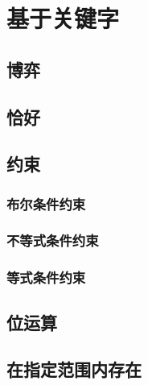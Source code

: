 \section{基于关键字}
\subsection{博弈}
\subsection{恰好}
\subsection{约束}
\subsubsection{布尔条件约束}
\subsubsection{不等式条件约束}
\subsubsection{等式条件约束}
\subsection{位运算}
\subsection{在指定范围内存在}
